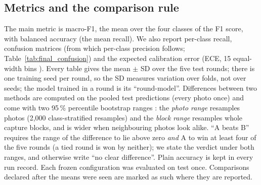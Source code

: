 \subsection{Metrics and the comparison rule}
\label{sec:setup:metrics}
The main metric is macro-F1, the mean over the four classes of the F1 score, with balanced accuracy (the mean recall). We also
report per-class recall, confusion matrices (from which per-class precision follows; Table~\ref{tab:final_confusion}) and the expected calibration error (ECE, 15 equal-width bins
\cite{guo2017calibration}). Every table gives the mean $\pm$ SD over the five test rounds; there is one training seed per
round, so the SD measures variation over folds, not over seeds; the model trained in a round is its ``round-model''. Differences between two methods are computed on the
pooled test predictions (every photo once) and come with two 95\,\% percentile bootstrap ranges \cite{efron1993bootstrap}:
the \emph{photo range} resamples photos (2{,}000 class-stratified resamples) and the \emph{block range} resamples whole
capture blocks, and is wider when neighbouring photos look alike. ``A beats B'' requires the range of the difference to lie
above zero \emph{and} A to win at least four of the five rounds (a tied round is won by neither); we state the verdict
under both ranges, and otherwise write ``no clear difference''. Plain accuracy is kept in every run record. Each frozen configuration was evaluated on test once.
Comparisons declared after the means were seen are marked as such where they are reported.

